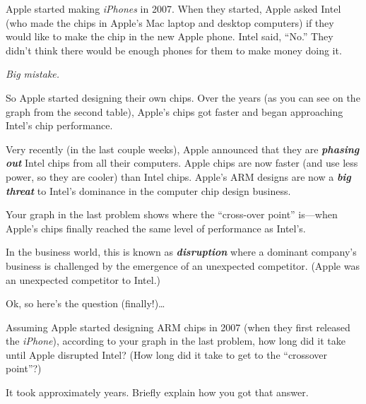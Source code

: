 \documentclass[10pt,letterpaper]{memoir}
\begin{document}
Apple started making {\itshape iPhones} in 2007.
When they started, Apple asked Intel 
(who made the chips in Apple's Mac laptop and desktop computers)
if they would like to make the chip in the new Apple phone.
Intel said, ``No.''
They didn't think there would be enough phones for them to make money doing it.

{\itshape Big mistake.}

So Apple started designing their own chips.
Over the years (as you can see on the graph from the second table),
Apple's chips got faster and began approaching Intel's chip performance.

Very recently (in the last couple weeks),
Apple announced that they are {\bfseries\itshape phasing out} Intel chips
from all their computers. 
Apple chips are now faster (and use less power, so they are cooler) than Intel chips.
Apple's ARM designs are now a {\bfseries\itshape big threat} to Intel's dominance 
in the computer chip design business.

Your graph in the last problem shows where the ``cross-over point'' is---when 
Apple's chips finally reached the same level of performance as Intel's.

In the business world, this is known as {\LARGE\bfseries\itshape disruption}
where a dominant company's business is challenged by the emergence 
of an unexpected competitor.
(Apple was an unexpected competitor to Intel.)

Ok, so here's the question (finally!)\dots

Assuming Apple started designing ARM chips in 2007 (when they first released the {\itshape iPhone}),
according to your graph in the last problem,
how long did it take until Apple disrupted Intel?
(How long did it take to get to the ``crossover point''?)

It took approximately  years.
Briefly explain how you got that answer.
\end{document}

